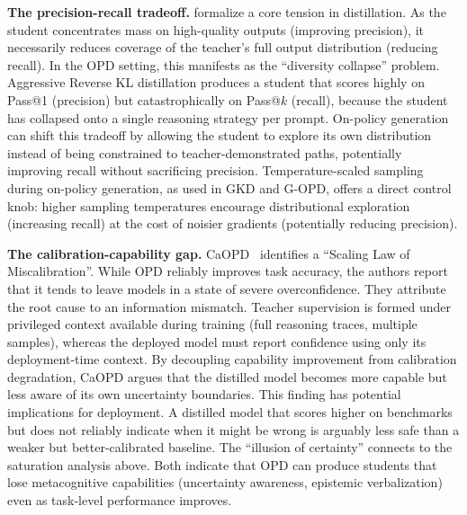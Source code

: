 \documentclass{article} %
\begin{document}
\textbf{The precision-recall tradeoff.} \citet{2505.13111} formalize a core tension in distillation. As the student concentrates mass on high-quality outputs (improving precision), it necessarily reduces coverage of the teacher's full output distribution (reducing recall). In the OPD setting, this manifests as the ``diversity collapse'' problem. Aggressive Reverse KL distillation produces a student that scores highly on Pass@1 (precision) but catastrophically on Pass@$k$ (recall), because the student has collapsed onto a single reasoning strategy per prompt. On-policy generation can shift this tradeoff by allowing the student to explore its own distribution instead of being constrained to teacher-demonstrated paths, potentially improving recall without sacrificing precision. Temperature-scaled sampling during on-policy generation, as used in GKD and G-OPD, offers a direct control knob: higher sampling temperatures encourage distributional exploration (increasing recall) at the cost of noisier gradients (potentially reducing precision).

\textbf{The calibration-capability gap.} CaOPD~\citep{2604.16830} identifies a ``Scaling Law of Miscalibration''. While OPD reliably improves task accuracy, the authors report that it tends to leave models in a state of severe overconfidence. They attribute the root cause to an information mismatch. Teacher supervision is formed under privileged context available during training (full reasoning traces, multiple samples), whereas the deployed model must report confidence using only its deployment-time context. By decoupling capability improvement from calibration degradation, CaOPD argues that the distilled model becomes more capable but less aware of its own uncertainty boundaries. This finding has potential implications for deployment. A distilled model that scores higher on benchmarks but does not reliably indicate when it might be wrong is arguably less safe than a weaker but better-calibrated baseline. The ``illusion of certainty'' connects to the saturation analysis above. Both indicate that OPD can produce students that lose metacognitive capabilities (uncertainty awareness, epistemic verbalization) even as task-level performance improves.
\end{document}
